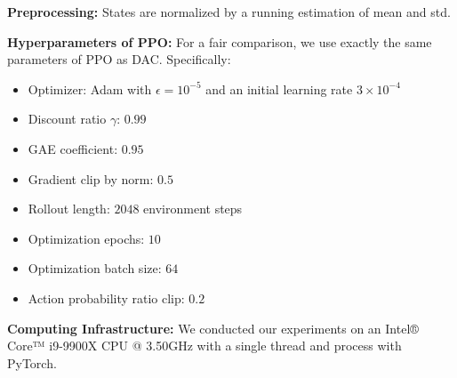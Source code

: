 \textbf{Preprocessing:} States are normalized by a running
estimation of mean and std.


\textbf{Hyperparameters of PPO:} For a fair comparison, we use
exactly the same parameters of PPO as DAC. Specifically:
\begin{itemize}
\item Optimizer: Adam with $\epsilon= 10^{-5}$ and an initial
  learning rate $3 \times 10^{-4}$

\item Discount ratio $\gamma$: $0.99$

\item GAE coefficient: $0.95$

\item Gradient clip by norm: $0.5$

\item Rollout length: $2048$ environment steps

\item Optimization epochs: $10$

\item Optimization batch size: $64$

\item Action probability ratio clip: $0.2$
\end{itemize}


\textbf{Computing Infrastructure:} We conducted our experiments
on an Intel® Core™ i9-9900X CPU @ 3.50GHz with a single thread
and process with PyTorch.


